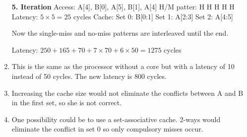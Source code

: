 \documentclass[a4paper]{article}
\begin{document}
\begin{enumerate}[label=\alph*)]
        \textbf{5. Iteration} \newline
        Access: A[4], B[0], A[5], B[1], A[4] \newline
        H/M patter: H H H H H \newline
        Latency: $5 \times 5 = 25$ cycles \newline
        Cache: Set 0: B[0:1] Set 1: A[2:3] Set 2: A[4:5] \newline

        Now the single-miss and no-miss patterns are interleaved until the end.

        Latency: $250 + 165 + 70 + 7 \times 70 + 6 \times 50 = 1275$ cycles
    

    \item This is the same as the processor without a core but with a latency of 10 instead of 50 cycles.
        The new latency is 800 cycles.
    
    \item Increasing the cache size would not eliminate the conflicts between A and B in the first set,
        so she is not correct.

    \item One possibility could be to use a set-associative cache. 2-ways would eliminate the
        conflict in set 0 so only compulsory misses occur.
\end{enumerate}
\end{document}
